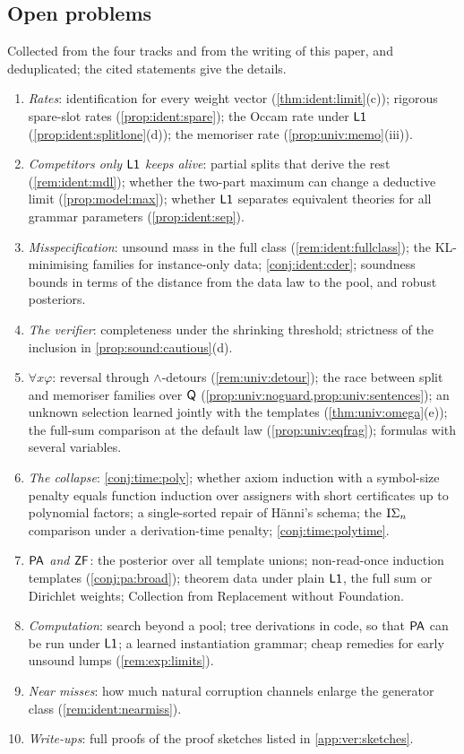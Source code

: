 \subsection{Open problems}\label{sec:disc:open}

Collected from the four tracks and from the writing of this paper, and deduplicated; the cited statements give the details.
\begin{enumerate}[leftmargin=*,itemsep=1pt]
\item \emph{Rates}: identification for every weight vector (\cref{thm:ident:limit}(c)); rigorous spare-slot rates (\cref{prop:ident:spare}); the Occam rate under $\mathord{\mathsf{L1}}$ (\cref{prop:ident:splitlone}(d)); the memoriser rate (\cref{prop:univ:memo}(iii)).
\item \emph{Competitors only $\mathord{\mathsf{L1}}$ keeps alive}: partial splits that derive the rest (\cref{rem:ident:mdl}); whether the two-part maximum can change a deductive limit (\cref{prop:model:max}); whether $\mathord{\mathsf{L1}}$ separates equivalent theories for all grammar parameters (\cref{prop:ident:sep}).
\item \emph{Misspecification}: unsound mass in the full class (\cref{rem:ident:fullclass}); the KL-minimising families for instance-only data; \cref{conj:ident:cder}; soundness bounds in terms of the distance from the data law to the pool, and robust posteriors.
\item \emph{The verifier}: completeness under the shrinking threshold; strictness of the inclusion in \cref{prop:sound:cautious}(d).
\item \emph{$\forall x\varphi$}: reversal through $\wedge$-detours (\cref{rem:univ:detour}); the race between split and memoriser families over $\mathsf{Q}$ (\cref{prop:univ:noguard,prop:univ:sentences}); an unknown selection learned jointly with the templates (\cref{thm:univ:omega}(e)); the full-sum comparison at the default law (\cref{prop:univ:eqfrag}); formulas with several variables.
\item \emph{The collapse}: \cref{conj:time:poly}; whether axiom induction with a symbol-size penalty equals function induction over assigners with short certificates up to polynomial factors; a single-sorted repair of H\"anni's schema; the $\mathrm{I}\Sigma_{n}$ comparison under a derivation-time penalty; \cref{conj:time:polytime}.
\item \emph{$\mathsf{PA}$ and $\mathsf{ZF}$}: the posterior over all template unions; non-read-once induction templates (\cref{conj:pa:broad}); theorem data under plain $\mathord{\mathsf{L1}}$, the full sum or Dirichlet weights; Collection from Replacement without Foundation.
\item \emph{Computation}: search beyond a pool; tree derivations in code, so that $\mathsf{PA}$ can be run under $\mathord{\mathsf{L1}}$; a learned instantiation grammar; cheap remedies for early unsound lumps (\cref{rem:exp:limits}).
\item \emph{Near misses}: how much natural corruption channels enlarge the generator class (\cref{rem:ident:nearmiss}).
\item \emph{Write-ups}: full proofs of the proof sketches listed in \cref{app:ver:sketches}.
\end{enumerate}

